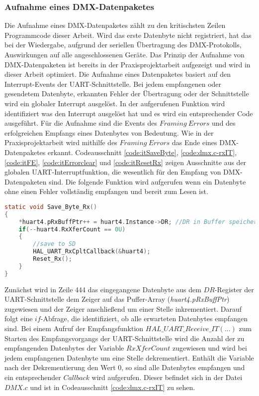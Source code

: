
\subsubsection{Aufnahme eines DMX-Datenpaketes}
Die Aufnahme eines DMX-Datenpaketes zählt zu den kritischsten Zeilen Programmcode dieser Arbeit. Wird das erste Datenbyte nicht registriert, hat das bei der Wiedergabe, aufgrund der seriellen Übertragung des DMX-Protokolls, Auswirkungen auf alle angeschlossenen Geräte. Das Prinzip der Aufnahme von DMX-Datenpaketen ist bereits in der Praxisprojektarbeit aufgezeigt und wird in dieser Arbeit optimiert.
Die Aufnahme eines Datenpaketes basiert auf den Interrupt-Events der UART-Schnittstelle. Bei jedem empfangenen oder gesendetem Datenbyte, erkannten Fehler der Übertragung oder der Schnittstelle wird ein globaler Interrupt ausgelöst. In der aufgerufenen Funktion wird identifiziert was den Interrupt ausgelöst hat und es wird ein entsprechender Code ausgeführt. Für die Aufnahme sind die Events des $Framing\ Errors$ und des erfolgreichen Empfangs eines Datenbytes von Bedeutung. Wie in der Praxisprojektarbeit wird mithilfe des $Framing\ Errors$ das Ende eines DMX-Datenpaketes erkannt. Codeausschnitt \ref{code:itSaveByte}, \ref{code:dmx.c-rxIT}, \ref{code:itFE}, \ref{code:itErrorclear} und \ref{code:itResetRx} zeigen Ausschnitte aus der globalen UART-Interruptfunktion, die wesentlich für den Empfang von DMX-Datenpaketen sind. Die folgende Funktion wird aufgerufen wenn ein Datenbyte ohne einen Fehler vollständig empfangen und bereit zum Lesen ist. 
\begin{lstlisting}[caption = stm32f4xx\_it.c: UART Save\_Byte\_Rx(),
label = code:itSaveByte, 
language = C, 
firstnumber = 442]
static void Save_Byte_Rx()
{
	*huart4.pRxBuffPtr++ = huart4.Instance->DR; //DR in Buffer speichern
	if(--huart4.RxXferCount == 0U)
	{
		//save to SD
		HAL_UART_RxCpltCallback(&huart4);
		Reset_Rx();
	}
}
\end{lstlisting}
Zunächst wird in Zeile 444 das eingegangene Datenbyte aus dem $DR$-Register der UART-Schnittstelle dem Zeiger auf das Puffer-Array (\textit{huart4.pRxBuffPtr}) zugewiesen und der Zeiger anschließend um einer Stelle inkrementiert.
Darauf folgt eine $if$-Abfrage, die identifiziert, ob alle erwarteten Datenbytes empfangen sind. Bei einem Aufruf der Empfangsfunktion $HAL\_UART\_Receive\_IT(...)$ zum Starten des Empfangsvorgangs der UART-Schnittstelle wird die Anzahl der zu empfangenden Datenbytes der Variable $RxXferCount$ zugewiesen und wird bei jedem empfangenen Datenbyte um eine Stelle dekrementiert. Enthält die Variable nach der Dekrementierung den Wert 0, so sind alle Datenbytes empfangen und ein entsprechender $Callback$ wird aufgerufen. Dieser befindet sich in der Datei $DMX.c$ und ist in Codeausschnitt \ref{code:dmx.c-rxIT} zu sehen. 
